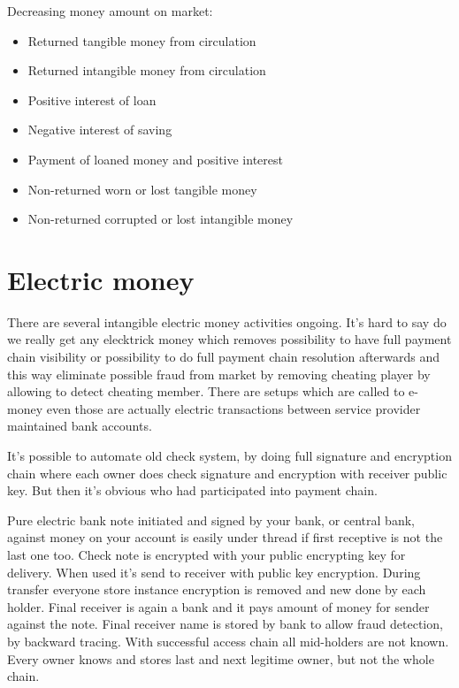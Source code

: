 Decreasing money amount on market:
\begin{itemize}
\item Returned tangible money from circulation
\item Returned intangible money from circulation
\item Positive interest of loan
\item Negative interest of saving
\item Payment of loaned money and positive interest
\item Non-returned worn or lost tangible money
\item Non-returned corrupted or lost intangible money
\end{itemize}

\section{Electric money}
There are several intangible electric money activities ongoing. It's hard to
say do we really get any elecktrick money which removes possibility to have
full payment chain visibility or possibility to do full payment chain
resolution afterwards and this way eliminate possible fraud from market by
removing cheating player by allowing to detect cheating member. There are
setups which are called to e-money even those are actually electric
transactions between service provider maintained bank accounts.

It's possible to automate old check system, by doing full signature and
encryption chain where each owner does check signature and encryption with
receiver public key. But then it's obvious who had participated into payment
chain.

Pure electric bank note initiated and signed by your bank, or central bank,
against money on your account is easily under thread if first receptive is not
the last one too. Check note is encrypted with your public encrypting key for
delivery. When used it's send to receiver with public key encryption. During
transfer everyone store instance encryption is removed and new done by each
holder. Final receiver is again a bank and it pays amount of money for sender
against the note. Final receiver name is stored by bank to allow fraud
detection, by backward tracing. With successful access chain all mid-holders
are not known. Every owner knows and stores last and next legitime owner, but
not the whole chain.

